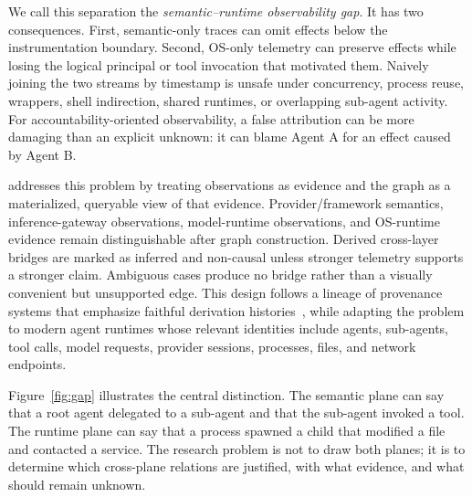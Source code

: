 We call this separation the \emph{semantic--runtime observability gap}. It has two consequences. First, semantic-only traces can omit effects below the instrumentation boundary. Second, OS-only telemetry can preserve effects while losing the logical principal or tool invocation that motivated them. Naively joining the two streams by timestamp is unsafe under concurrency, process reuse, wrappers, shell indirection, shared runtimes, or overlapping sub-agent activity. For accountability-oriented observability, a false attribution can be more damaging than an explicit unknown: it can blame Agent A for an effect caused by Agent B.

\system addresses this problem by treating observations as evidence and the graph as a materialized, queryable view of that evidence. Provider/framework semantics, inference-gateway observations, model-runtime observations, and OS-runtime evidence remain distinguishable after graph construction. Derived cross-layer bridges are marked as inferred and non-causal unless stronger telemetry supports a stronger claim. Ambiguous cases produce no bridge rather than a visually convenient but unsupported edge. This design follows a lineage of provenance systems that emphasize faithful derivation histories~\cite{muniswamy2006pass,pohly2012hifi,bates2015lpm,pasquier2017camflow}, while adapting the problem to modern agent runtimes whose relevant identities include agents, sub-agents, tool calls, model requests, provider sessions, processes, files, and network endpoints.

Figure~\ref{fig:gap} illustrates the central distinction. The semantic plane can say that a root agent delegated to a sub-agent and that the sub-agent invoked a tool. The runtime plane can say that a process spawned a child that modified a file and contacted a service. The research problem is not to draw both planes; it is to determine which cross-plane relations are justified, with what evidence, and what should remain unknown.

